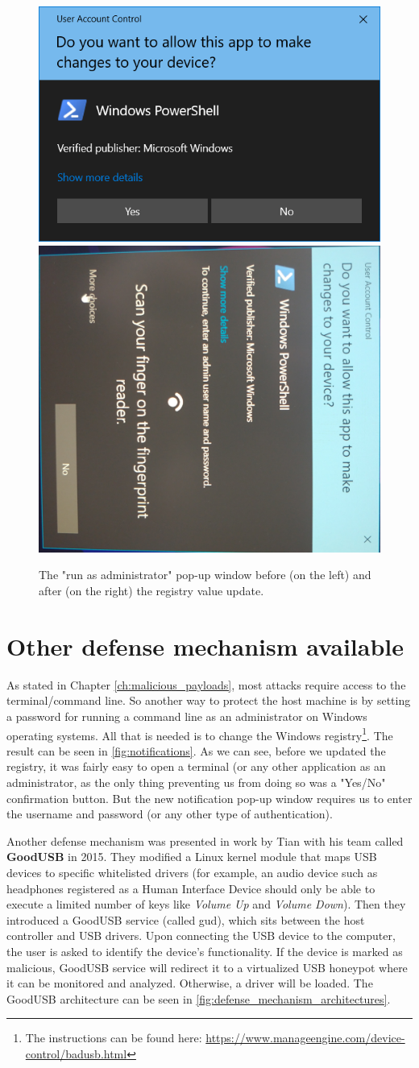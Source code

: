 \begin{figure}[ht]
    \centering
    \includegraphics[width=0.4\linewidth]{./obrazky-figures/basic_notification.PNG}
    \includegraphics[width=0.4\linewidth]{./obrazky-figures/notification_with_authentication.jpg}
    \caption{The "run as administrator" pop-up window before (on the left) and after (on the right) the registry value update.}
    \label{fig:notifications}
\end{figure}

\section{Other defense mechanism available}
\label{sec:defense_other_strategies}
As stated in Chapter \ref{ch:malicious_payloads}, most attacks require access to the terminal/command line. So another way to protect the host machine is by setting a password for running a command line as an administrator on Windows operating systems. All that is needed is to change the Windows registry\footnote{The instructions can be found here: \url{https://www.manageengine.com/device-control/badusb.html}}. The result can be seen in \autoref{fig:notifications}. As we can see, before we updated the registry, it was fairly easy to open a terminal (or any other application as an administrator, as the only thing preventing us from doing so was a "Yes/No" confirmation button. But the new notification pop-up window requires us to enter the username and password (or any other type of authentication).

Another defense mechanism was presented in work \cite{goodusb} by Tian with his team called \textbf{GoodUSB} in 2015. They modified a Linux kernel module that maps USB devices to specific whitelisted drivers (for example, an audio device such as headphones registered as a Human Interface Device should only be able to execute a limited number of keys like \emph{Volume Up} and \emph{Volume Down}). Then they introduced a GoodUSB service (called gud), which sits between the host controller and USB drivers. Upon connecting the USB device to the computer, the user is asked to identify the device's functionality. If the device is marked as malicious, GoodUSB service will redirect it to a virtualized USB honeypot where it can be monitored and analyzed. Otherwise, a driver will be loaded. The GoodUSB architecture can be seen in \autoref{fig:defense_mechanism_architectures}.

